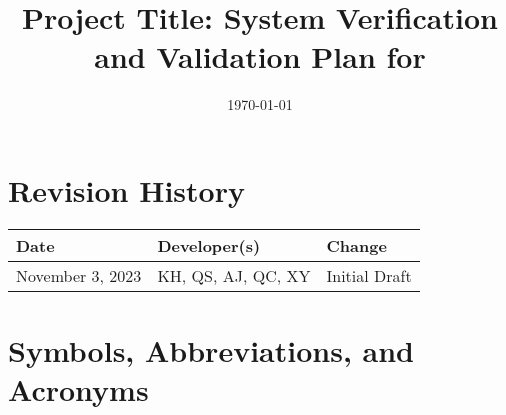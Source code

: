 \documentclass[12pt, titlepage]{article}
\begin{document}
\title{Project Title: System Verification and Validation Plan for \progname{}}
\author{\authname}
\date{\today}

\maketitle


\section*{Revision History}

\begin{tabularx}{\textwidth}{llX}
\toprule {\bf Date} & {\bf Developer(s)} & {\bf Change} \\
\midrule
November 3, 2023 & KH, QS, AJ, QC, XY & Initial Draft \\
\bottomrule
\end{tabularx}

\newpage

\tableofcontents

\listoftables

\newpage

\section{Symbols, Abbreviations, and Acronyms}
\end{document}
